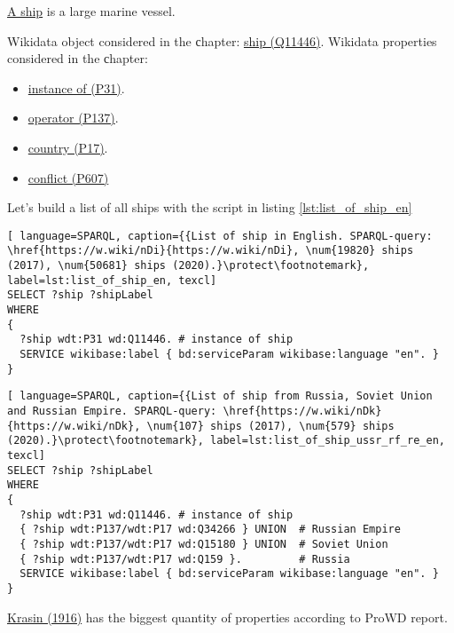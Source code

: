\href{https://en.wikipedia.org/wiki/Ship}{A ship} is a large marine vessel.

Wikidata object considered in the сhapter: \href{https://www.wikidata.org/wiki/Q11446}{ship (Q11446)}.
Wikidata properties considered in the сhapter: 
\begin{itemize}
  \item \href{https://www.wikidata.org/wiki/Property:P31}{instance of (P31)}.
  \item \href{https://www.wikidata.org/wiki/Property:P137}{operator  (P137)}.
  \item \href{https://www.wikidata.org/wiki/Property:P17}{country  (P17)}.
  \item \href{https://www.wikidata.org/wiki/Property:P607}{conflict  (P607)}
\end{itemize}

Let's build a list of all ships with the script in listing \ref{lst:list_of_ship_en}

\begin{lstlisting}[ language=SPARQL, caption={{List of ship in English. SPARQL-query:  \href{https://w.wiki/nDi}{https://w.wiki/nDi}, \num{19820} ships (2017), \num{50681} ships (2020).}\protect\footnotemark}, label=lst:list_of_ship_en, texcl]
SELECT ?ship ?shipLabel
WHERE
{
  ?ship wdt:P31 wd:Q11446. # instance of ship
  SERVICE wikibase:label { bd:serviceParam wikibase:language "en". }
}
\end{lstlisting}

  
\begin{lstlisting}[ language=SPARQL, caption={{List of ship from Russia, Soviet Union and Russian Empire. SPARQL-query: \href{https://w.wiki/nDk}{https://w.wiki/nDk}, \num{107} ships (2017), \num{579} ships (2020).}\protect\footnotemark}, label=lst:list_of_ship_ussr_rf_re_en, texcl]
SELECT ?ship ?shipLabel
WHERE
{
  ?ship wdt:P31 wd:Q11446. # instance of ship
  { ?ship wdt:P137/wdt:P17 wd:Q34266 } UNION  # Russian Empire
  { ?ship wdt:P137/wdt:P17 wd:Q15180 } UNION  # Soviet Union
  { ?ship wdt:P137/wdt:P17 wd:Q159 }.         # Russia
  SERVICE wikibase:label { bd:serviceParam wikibase:language "en". }
}
\end{lstlisting}

\href{https://www.wikidata.org/wiki/Q281147}{Krasin (1916)} has the biggest quantity of properties according to ProWD report.
  


